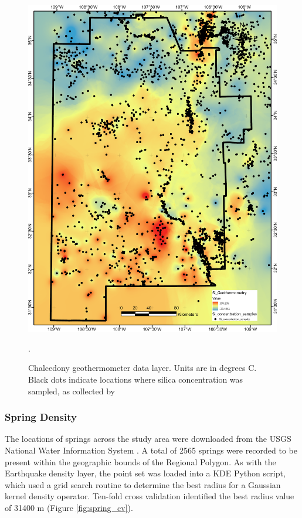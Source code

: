 \begin{figure}[!htp]
\centering
\includegraphics[scale=.50]{templates/images/Figure-SiTemp.png}
\caption[Silica geothermometer temperature data layer]{Chalcedony geothermometer data layer. Units are in degrees C. Black dots indicate locations where silica concentration was sampled, as collected by \protect\citet{bielicki_hydrogeolgic_2015}}.
\label{fig:feat_si_temp}
\end{figure}

\subsubsection{Spring Density}

The locations of springs across the study area were downloaded from the USGS National Water Information System \citep{usgs_national_2021}. A total of 2565 springs were recorded to be present within the geographic bounds of the Regional Polygon. As with the Earthquake density layer, the point set was loaded into a KDE Python script, which used a grid search routine to determine the best radius for a Gaussian kernel density operator. Ten-fold cross validation identified the best radius value of 31400 m (Figure \ref{fig:spring_cv}). 

